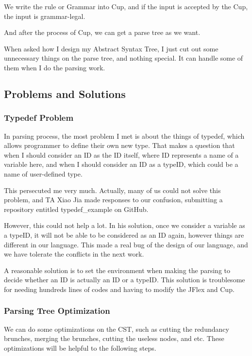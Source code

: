 \documentclass[preprint, 9pt]{sigplanconf}
\begin{document}
    We write the rule or Grammar into Cup, and if the input is accepted by the Cup, the input is grammar-legal.

    And after the process of Cup, we can get a parse tree as we want.

    When asked how I design my Abstract Syntax Tree, I just cut out some unnecessary things on the parse tree, and nothing special.
    It can handle some of them when I do the parsing work.

    \subsection{Problems and Solutions}

    \subsubsection{Typedef Problem}
    In parsing process, the most problem I met is about the things of typedef, which allows programmer to define their own new type.
    That makes a question that when I should consider an ID as the ID itself, where ID represents a name of a variable here, and when I should consider an ID as a typeID, which could be a name of user-defined type.

    This persecuted me very much.
    Actually, many of us could not solve this problem, and TA Xiao Jia made responses to our confusion, submitting a repository entitled typedef\_example on GitHub.

    However, this could not help a lot.
    In his solution, once we consider a variable as a typeID, it will not be able to be considered as an ID again, however things are different in our language.
    This made a real bug of the design of our language, and we have tolerate the conflicts in the next work.

    A reasonable solution is to set the environment when making the parsing to decide whether an ID is actually an ID or a typeID.
    This solution is troublesome for needing hundreds lines of codes and having to modify the JFlex and Cup.

    \subsubsection{Parsing Tree Optimization}

    We can do some optimizations on the CST, such as cutting the redundancy brunches, merging the brunches, cutting the useless nodes, and etc.
    These optimizations will be helpful to the following steps.
\end{document}
